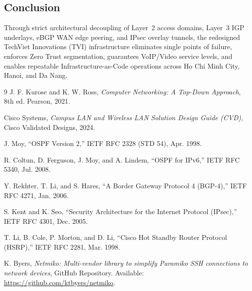 \subsection{Conclusion}
Through strict architectural decoupling of Layer~2 access domains, Layer~3 IGP underlays, eBGP WAN edge peering, and IPsec overlay tunnels, the redesigned TechViet Innovations (TVI) infrastructure eliminates single points of failure, enforces Zero Trust segmentation, guarantees VoIP/Video service levels, and enables repeatable Infrastructure-as-Code operations across Ho Chi Minh City, Hanoi, and Da Nang.

\clearpage
\begin{thebibliography}{9}
J. F. Kurose and K. W. Ross, \emph{Computer Networking: A Top-Down Approach}, 8th ed. Pearson, 2021.

Cisco Systems, \emph{Campus LAN and Wireless LAN Solution Design Guide (CVD)}, Cisco Validated Designs, 2024.

J. Moy, ``OSPF Version 2,'' IETF RFC 2328 (STD 54), Apr. 1998.

R. Coltun, D. Ferguson, J. Moy, and A. Lindem, ``OSPF for IPv6,'' IETF RFC 5340, Jul. 2008.

Y. Rekhter, T. Li, and S. Hares, ``A Border Gateway Protocol 4 (BGP-4),'' IETF RFC 4271, Jan. 2006.

S. Kent and K. Seo, ``Security Architecture for the Internet Protocol (IPsec),'' IETF RFC 4301, Dec. 2005.

T. Li, B. Cole, P. Morton, and D. Li, ``Cisco Hot Standby Router Protocol (HSRP),'' IETF RFC 2281, Mar. 1998.

K. Byers, \emph{Netmiko: Multi-vendor library to simplify Paramiko SSH connections to network devices}, GitHub Repository. Available: \url{https://github.com/ktbyers/netmiko}.
\end{thebibliography}
